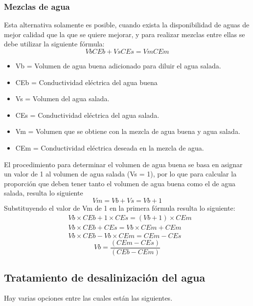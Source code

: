 \subsubsection{Mezclas de agua}  
Esta alternativa solamente es posible, cuando exista la disponibilidad de aguas de
mejor calidad que la que se quiere mejorar, y para realizar mezclas entre ellas se
debe utilizar la siguiente fórmula:
\begin{equation}
    VbCEb + VsCEs = VmCEm
\end{equation}
\begin{notation}
    \begin{itemize}
        \item Vb = Volumen de agua buena adicionado para diluir el agua salada.
        \item CEb = Conductividad eléctrica del agua buena
        \item Vs = Volumen del agua salada.
        \item CEs = Conductividad eléctrica del agua salada.
        \item Vm = Volumen que se obtiene con la mezcla de agua buena y agua salada.
        \item CEm = Conductividad eléctrica deseada en la mezcla de agua.
    \end{itemize}
\end{notation}
El procedimiento para determinar el volumen de agua buena se basa en asignar un valor de 1 al volumen de agua salada (Vs = 1), por lo que para calcular la proporción que deben tener tanto el volumen de agua buena como el de agua salada, resulta lo siguiente
\begin{equation}
    Vm = Vb + Vs = Vb + 1
\end{equation}
Substituyendo el valor de Vm de 1 en la primera fórmula resulta lo siguiente:
\begin{align*}
    &Vb \times CEb + 1 \times CEs = (Vb + 1) \times CEm\\
    &Vb \times CEb + CEs = Vb \times CEm + CEm\\ 
    &Vb \times CEb - Vb \times CEm = CEm - CEs
\end{align*}
\begin{equation}
  Vb = \frac{(CEm - CEs)}{(CEb - CEm)}
\end{equation}

\subsection{Tratamiento de desalinización del agua}
Hay varias opciones entre las cuales están las siguientes.

